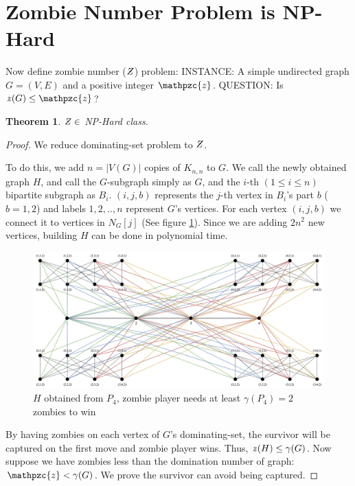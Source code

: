 \documentclass[1p]{elsarticle}
\newtheorem{theorem}{Theorem}
\newcommand{\NPZ}{\ooalign{$Z$\cr\hfil\rule[.8ex]{.3em}{.09ex}\hfil\cr}}
\newcommand{\zn}{\ooalign{$z$\cr\hfil\rule[.5ex]{.2em}{.08ex}\hfil\cr}}
\begin{document}
	\section{Zombie Number Problem is NP-Hard}\label{np-zombienumber}
	Now define zombie number ($\NPZ$) problem:
	{\newline}
	INSTANCE: A simple undirected graph $G = (V,E)$ and a positive integer $\mathpzc{z}$.
	{\newline}
	QUESTION: Is $\zn (G) \leq \mathpzc{z}$?

	\begin{theorem}
		$\NPZ \in$ NP-Hard class.
	\end{theorem}
	\begin{proof}
		We reduce dominating-set problem to $\NPZ$.

		To do this, we add $n = |V(G)|$ copies of $K_{n,n}$ to $G$. We call the newly obtained graph $H$, and call the
		$G$-subgraph simply as $G$, and the $i$-th $(1 \leq i \leq n)$ bipartite subgraph as $B_i$. $(i,j,b)$ represents
		the $j$-th vertex in $B_i$'s part $b$ ($b = 1,2$) and labels $1,2,..,n$ represent $G$'s vertices. For each vertex
		$(i,j,b)$ we connect it to vertices in $N_G[j]$ (See figure \ref{fig:p8}). Since we are adding $2n^2$ new
		vertices, building $H$ can be done in polynomial time.

		\begin{figure}[h!]
			\centering
			\includegraphics[width=0.9\linewidth]{sec5.png}
			\caption{$H$ obtained from $P_4$, zombie player needs at least $\gamma(P_4) = 2$ zombies to win}
			\label{fig:p8}
		\end{figure}

		By having zombies on each vertex of $G$'s dominating-set, the survivor will be captured on the first move and zombie
		player wins. Thus, $\zn(H) \leq \gamma(G)$. Now suppose we have zombies less than the domination number of
		graph: $\mathpzc{z} < \gamma(G)$. We prove the survivor can avoid being captured.
		

\end{proof}
\end{document}
